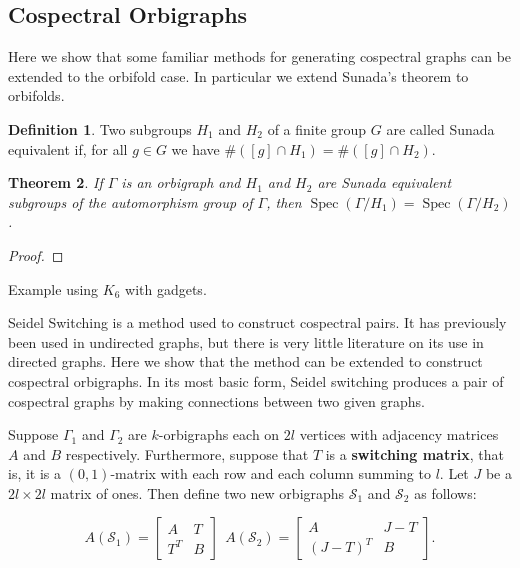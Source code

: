 \documentclass[12pt]{article}
\theoremstyle{plain}
\newtheorem{theorem}{Theorem}
\theoremstyle{definition}
\newtheorem{definition}[theorem]{Definition}
\theoremstyle{remark}
\DeclareMathOperator*{\spec}{Spec}
\begin{document}
  \subsection{Cospectral Orbigraphs}

  Here we show that some familiar methods for generating cospectral graphs can be extended to the orbifold case. In particular we extend Sunada's theorem to orbifolds.

  \begin{definition}\label{def:SunadaEquivalentDefn}
    Two subgroups $H_1$ and $H_2$  of a finite group $G$ are called Sunada equivalent if, for all $g \in G$ we have $\#([g] \cap H_1) = \#([g] \cap H_2)$.
  \end{definition}

  \begin{theorem}\label{thm:Sunada}
    If $\Gamma$ is an orbigraph and $H_1$ and $H_2$ are Sunada equivalent subgroups of the automorphism group of $\Gamma$, then $\spec(\Gamma / H_1) = \spec(\Gamma / H_2)$.
  \end{theorem}
  \begin{proof}
    
  \end{proof}

  Example using $K_6$ with gadgets.

  Seidel Switching is a method used to construct cospectral pairs. It has previously been used in undirected graphs, but there is very little literature on its use in directed graphs. Here we show that the method can be extended to construct cospectral orbigraphs. In its most basic form, Seidel switching produces a pair of cospectral graphs by making connections between two given graphs. 

  Suppose $\Gamma_1$ and $\Gamma_2$ are $k$-orbigraphs each on $2l$ vertices with adjacency matrices $A$ and $B$ respectively. Furthermore, suppose that $T$ is a \textbf{switching matrix}, that is, it is a $(0,1)$-matrix with each row and each column summing to $l$. Let $J$ be a $2l \times 2l$ matrix of ones. Then define two new orbigraphs $\mathcal{S}_1$ and $\mathcal{S}_2$ as follows:

  $$
  A(\mathcal{S}_1) = \begin{bmatrix}
      A & T \\
      T^T & B
  \end{bmatrix} \ \ 
  A(\mathcal{S}_2) = \begin{bmatrix}
      A & J - T \\
      (J - T)^T & B
  \end{bmatrix}.
  $$
\end{document}
